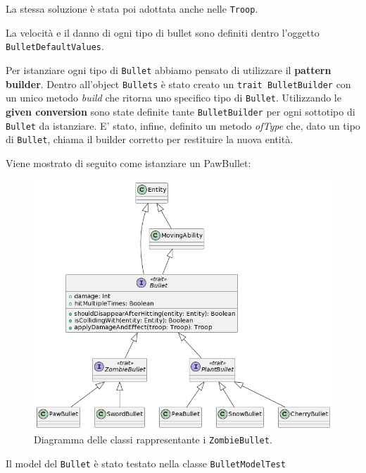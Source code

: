 



La stessa soluzione è stata poi adottata anche nelle \texttt{Troop}.

La velocità e il danno di ogni tipo di bullet sono definiti dentro l'oggetto \texttt{BulletDefaultValues}.

Per istanziare ogni tipo di \texttt{Bullet} abbiamo pensato di utilizzare il \textbf{pattern builder}.
Dentro all'object \texttt{Bullets} è stato creato un \texttt{trait BulletBuilder}
con un unico metodo \textit{build} che ritorna uno specifico tipo di \texttt{Bullet}.
Utilizzando le \textbf{given conversion} sono state definite tante \texttt{BulletBuilder} per ogni sottotipo di \texttt{Bullet} da istanziare.
E' stato, infine, definito un metodo \textit{ofType} che, dato un tipo
di \texttt{Bullet}, chiama il builder corretto per restituire la nuova entità.



Viene mostrato di seguito come istanziare un PawBullet:



\begin{figure}[H]
    \centering
    \includegraphics[width=1\linewidth]{images/model-bullet}
    \caption{Diagramma delle classi rappresentante i \texttt{ZombieBullet}.}
    \label{fig:class-bullet}
\end{figure}

Il model del \texttt{Bullet} è stato testato nella classe \texttt{BulletModelTest}

